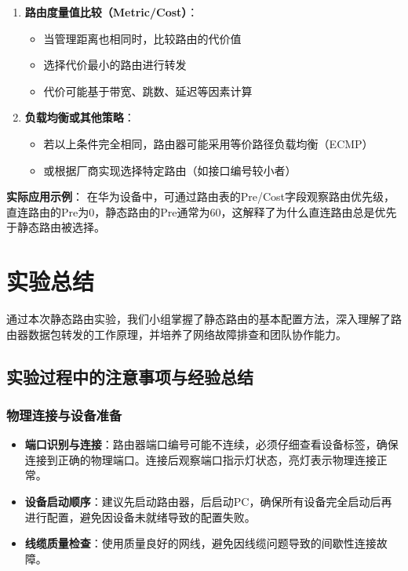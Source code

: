 \documentclass[a4paper]{article}
\begin{document}
\begin{enumerate}
\begin{myquote}[colback=yellow!5!white,colframe=yellow!75!black,title=回答]
\begin{enumerate}
        \item \textbf{路由度量值比较（Metric/Cost）}：
        \begin{itemize}
            \item 当管理距离也相同时，比较路由的代价值
            \item 选择代价最小的路由进行转发
            \item 代价可能基于带宽、跳数、延迟等因素计算
        \end{itemize}
        
        \item \textbf{负载均衡或其他策略}：
        \begin{itemize}
            \item 若以上条件完全相同，路由器可能采用等价路径负载均衡（ECMP）
            \item 或根据厂商实现选择特定路由（如接口编号较小者）
        \end{itemize}
    \end{enumerate}
    
    \textbf{实际应用示例}：
    在华为设备中，可通过路由表的Pre/Cost字段观察路由优先级，直连路由的Pre为0，静态路由的Pre通常为60，这解释了为什么直连路由总是优先于静态路由被选择。
    \end{myquote}

\end{enumerate}

\section{实验总结}

通过本次静态路由实验，我们小组掌握了静态路由的基本配置方法，深入理解了路由器数据包转发的工作原理，并培养了网络故障排查和团队协作能力。

\subsection{实验过程中的注意事项与经验总结}

\subsubsection{物理连接与设备准备}
\begin{itemize}
    \item \textbf{端口识别与连接}：路由器端口编号可能不连续，必须仔细查看设备标签，确保连接到正确的物理端口。连接后观察端口指示灯状态，亮灯表示物理连接正常。
    \item \textbf{设备启动顺序}：建议先启动路由器，后启动PC，确保所有设备完全启动后再进行配置，避免因设备未就绪导致的配置失败。
    \item \textbf{线缆质量检查}：使用质量良好的网线，避免因线缆问题导致的间歇性连接故障。
\end{itemize}
\end{document}

